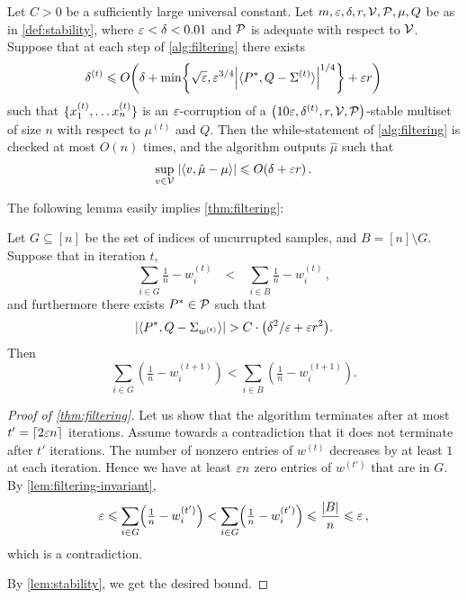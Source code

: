 \begin{theorem}\label{thm:filtering}
    Let $C > 0$ be a sufficiently large universal constant.
    Let $m,\varepsilon,{\delta}, r, \mathcal V, \mathcal P, \mu, Q$ be as in \cref{def:stability}, where $\varepsilon < {\delta} < 0.01$ and $\mathcal P$ is adequate with respect to $\mathcal V$.
    Suppose that at each step of \cref{alg:filtering} there exists 
    \[
    \delta^{(t)} \le O\Paren{\delta + \min\Set{\sqrt{\e}, \e^{3/4}\Abs{\iprod{P^*, Q-\Sigma^{(t)}  }} ^{1/4}} + \e r }
    \]
    such that
    $\{x_1^{(t)},\ldots x_n^{(t)}\}$ is an $\varepsilon$-corruption of a $\Paren{10\e,\delta^{(t)},r,\cV,\cP}$-stable multiset of size $n$ with respect to $\mu^{(t)}$ and $Q$.
    Then the while-statement of \cref{alg:filtering} is checked at most $O(n)$ times, and the algorithm outputs $\hat{\mu}$ such that 
    \[
    \sup_{v\in \cV}\; \Abs{\iprod{v, \hat{\mu}-\mu}} \le O\Paren{\delta + \e r}\,.
    \]
\end{theorem}

The following lemma easily implies \cref{thm:filtering}:

\begin{lemma}\label{lem:filtering-invariant} 
Let $G\subseteq [n]$ be the set of indices of uncurrupted samples, and $B = [n]\setminus G$.
Suppose that in iteration $t$, \begin{equation}\label{eq:filtering-invariant}
\sum_{i \in G} \tfrac{1}{n} - w_i^{(t)} \quad \text{<} \quad \sum_{i \in B} \tfrac{1}{n} - w_i^{(t)}\,,
\end{equation}
and furthermore there exists $P^*\in \mathcal P$ such that
\[
\Abs{\iprod{P^*, Q-\Sigma_{w^{(t)}}}} > C\cdot \Paren{\delta^2/\e + \e r^2}.
\]
Then
\[
\sum_{i \in G} \left( \tfrac{1}{n} - w_i^{(t+1)} \right) <
\sum_{i \in B} \left( \tfrac{1}{n} - w_i^{(t+1)} \right).
\]
\end{lemma}

\begin{proof}[Proof of \cref{thm:filtering}]
Let us show that the algorithm terminates after at most $t' = \lceil 2\varepsilon n\rceil $ iterations. Assume towards a contradiction that it does not terminate after $t'$ iterations. The number of nonzero entries of $w^{(t)}$ decreases by at least $1$ at each iteration. Hence we have at least $\varepsilon n$ zero entries of $w^{(t')}$ that are in $G$. By \cref{lem:filtering-invariant},
\[
\e \le \sum_{i\in G} \Paren{\tfrac{1}{n} - w^{(t')}_i} <  \sum_{i\in G} \Paren{\tfrac{1}{n} - w^{(t')}_i} \le \frac{\card{B}}{n} \le \e\,,
\]
which is a contradiction.

By \cref{lem:stability}, we get the desired bound. 
\end{proof}

